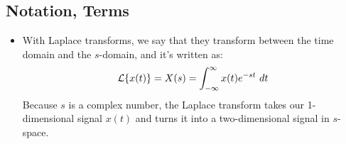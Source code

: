 \subsection{Notation, Terms}
\begin{itemize}
	\item With Laplace transforms, we say that they transform between the time domain and the \( s \)-domain, and 
		it's written as:
		\[
		\mathcal L \{x(t)\}  = X(s) = \int_{-\infty}^{\infty} x(t) e^{-st}\ d t 
		\] 
		Because \( s \) is a complex number, the Laplace transform takes our 1-dimensional signal 
		\( x(t) \) and turns it into a two-dimensional signal in  \( s\)-space. 
\end{itemize}
